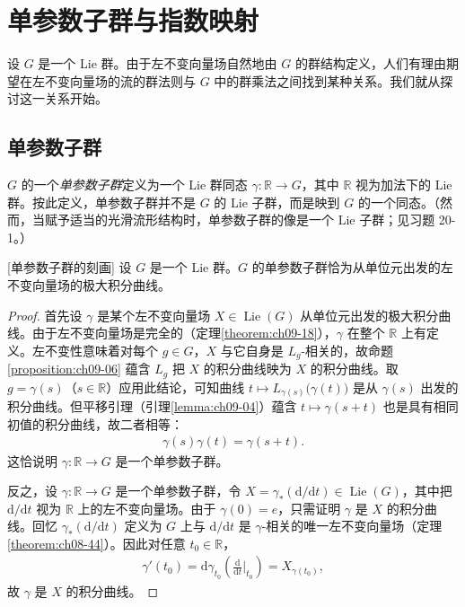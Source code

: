 \documentclass[../../main.tex]{subfiles}
\begin{document}
\section{单参数子群与指数映射}\label{section:ch20-one-parameter}

设 $G$ 是一个 Lie 群。由于左不变向量场自然地由 $G$ 的群结构定义，人们有理由期望在左不变向量场的流的群法则与 $G$ 中的群乘法之间找到某种关系。我们就从探讨这一关系开始。

\subsection{单参数子群}

$G$ 的一个\emph{单参数子群}定义为一个 Lie 群同态 $\gamma\colon\mathbb{R}\to G$，其中 $\mathbb{R}$ 视为加法下的 Lie 群。按此定义，单参数子群并不是 $G$ 的 Lie 子群，而是映到 $G$ 的一个同态。（然而，当赋予适当的光滑流形结构时，单参数子群的像是一个 Lie 子群；见习题 20-1。）

\begin{theorem}{[单参数子群的刻画]}\label{theorem:ch20-单参数子群刻画}
设 $G$ 是一个 Lie 群。$G$ 的单参数子群恰为从单位元出发的左不变向量场的极大积分曲线。
\end{theorem}

\begin{proof}
首先设 $\gamma$ 是某个左不变向量场 $X\in\operatorname{Lie}(G)$ 从单位元出发的极大积分曲线。由于左不变向量场是完全的（定理\cref{theorem:ch09-18}），$\gamma$ 在整个 $\mathbb{R}$ 上有定义。左不变性意味着对每个 $g\in G$，$X$ 与它自身是 $L_g$-相关的，故命题\cref{proposition:ch09-06} 蕴含 $L_g$ 把 $X$ 的积分曲线映为 $X$ 的积分曲线。取 $g=\gamma(s)$（$s\in\mathbb{R}$）应用此结论，可知曲线 $t\mapsto L_{\gamma(s)}\bigl(\gamma(t)\bigr)$ 是从 $\gamma(s)$ 出发的积分曲线。但平移引理（引理\cref{lemma:ch09-04}）蕴含 $t\mapsto\gamma(s+t)$ 也是具有相同初值的积分曲线，故二者相等：
\begin{align*}
\gamma(s)\gamma(t)=\gamma(s+t).
\end{align*}
这恰说明 $\gamma\colon\mathbb{R}\to G$ 是一个单参数子群。

反之，设 $\gamma\colon\mathbb{R}\to G$ 是一个单参数子群，令 $X=\gamma_*(\mathrm{d}/\mathrm{d}t)\in\operatorname{Lie}(G)$，其中把 $\mathrm{d}/\mathrm{d}t$ 视为 $\mathbb{R}$ 上的左不变向量场。由于 $\gamma(0)=e$，只需证明 $\gamma$ 是 $X$ 的积分曲线。回忆 $\gamma_*(\mathrm{d}/\mathrm{d}t)$ 定义为 $G$ 上与 $\mathrm{d}/\mathrm{d}t$ 是 $\gamma$-相关的唯一左不变向量场（定理\cref{theorem:ch08-44}）。因此对任意 $t_0\in\mathbb{R}$，
\begin{align*}
\gamma'(t_0)=\mathrm{d}\gamma_{t_0}\left(\frac{\mathrm{d}}{\mathrm{d}t}\bigg|_{t_0}\right)=X_{\gamma(t_0)},
\end{align*}
故 $\gamma$ 是 $X$ 的积分曲线。
\end{proof}
\end{document}
